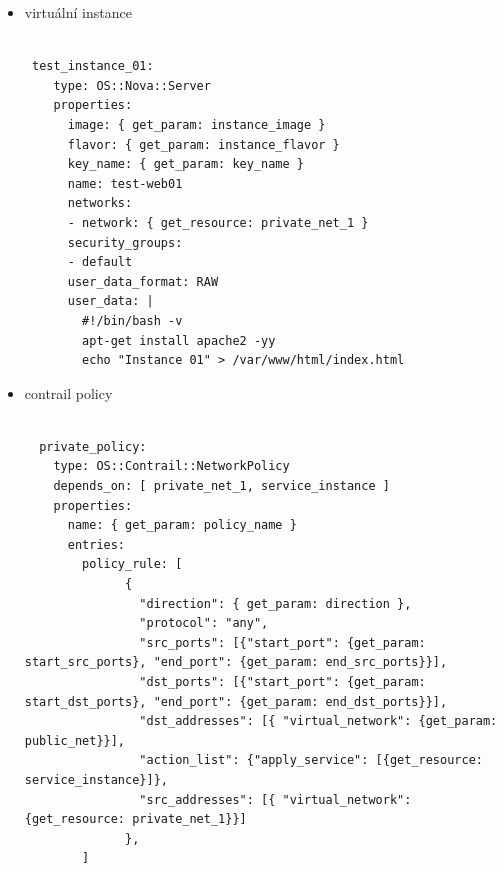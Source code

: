 \begin{itemize}
\item virtuální instance
\begin{lstlisting}[caption=Virtuální instance pro testování]

 test_instance_01:
    type: OS::Nova::Server
    properties:
      image: { get_param: instance_image }
      flavor: { get_param: instance_flavor }
      key_name: { get_param: key_name }
      name: test-web01
      networks:
      - network: { get_resource: private_net_1 }
      security_groups:
      - default
      user_data_format: RAW
      user_data: |
        #!/bin/bash -v
        apt-get install apache2 -yy
        echo "Instance 01" > /var/www/html/index.html

\end{lstlisting}

\item contrail policy

\begin{lstlisting}[caption=Contrail network policy]

  private_policy:
    type: OS::Contrail::NetworkPolicy
    depends_on: [ private_net_1, service_instance ]
    properties:
      name: { get_param: policy_name }
      entries:
        policy_rule: [
              { 
                "direction": { get_param: direction }, 
                "protocol": "any", 
                "src_ports": [{"start_port": {get_param: start_src_ports}, "end_port": {get_param: end_src_ports}}],
                "dst_ports": [{"start_port": {get_param: start_dst_ports}, "end_port": {get_param: end_dst_ports}}],
                "dst_addresses": [{ "virtual_network": {get_param: public_net}}], 
                "action_list": {"apply_service": [{get_resource: service_instance}]}, 
                "src_addresses": [{ "virtual_network": {get_resource: private_net_1}}] 
              }, 
        ]

\end{lstlisting}
\end{itemize}



